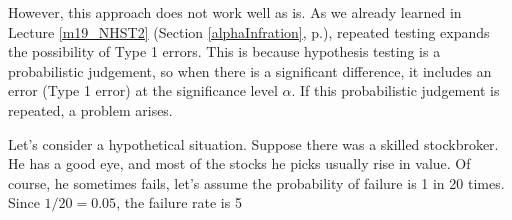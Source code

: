 \documentclass{ltjbook}
\begin{document}
However, this approach does not work well as is. As we already learned in Lecture \ref{m19_NHST2} (Section \ref{alphaInfration}, p.\pageref{alphaInfration}), repeated testing expands the possibility of Type 1 errors.
This is because hypothesis testing is a probabilistic judgement, so when there is a significant difference, it includes an error (Type 1 error) at the significance level $\alpha$. If this probabilistic judgement is repeated, a problem arises.

Let's consider a hypothetical situation. Suppose there was a skilled stockbroker. He has a good eye, and most of the stocks he picks usually rise in value. Of course, he sometimes fails, let's assume the probability of failure is 1 in 20 times. Since $1/20=0.05$, the failure rate is 5%
\end{document}

